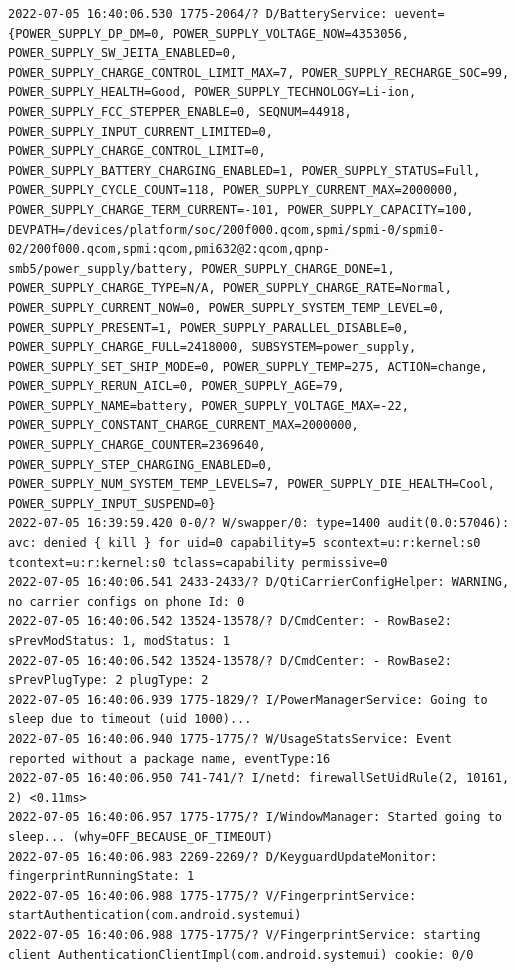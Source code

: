\documentclass[a4paper,12pt]{book}
\begin{document}
\begin{lstlisting}
2022-07-05 16:40:06.530 1775-2064/? D/BatteryService: uevent={POWER_SUPPLY_DP_DM=0, POWER_SUPPLY_VOLTAGE_NOW=4353056, POWER_SUPPLY_SW_JEITA_ENABLED=0, POWER_SUPPLY_CHARGE_CONTROL_LIMIT_MAX=7, POWER_SUPPLY_RECHARGE_SOC=99, POWER_SUPPLY_HEALTH=Good, POWER_SUPPLY_TECHNOLOGY=Li-ion, POWER_SUPPLY_FCC_STEPPER_ENABLE=0, SEQNUM=44918, POWER_SUPPLY_INPUT_CURRENT_LIMITED=0, POWER_SUPPLY_CHARGE_CONTROL_LIMIT=0, POWER_SUPPLY_BATTERY_CHARGING_ENABLED=1, POWER_SUPPLY_STATUS=Full, POWER_SUPPLY_CYCLE_COUNT=118, POWER_SUPPLY_CURRENT_MAX=2000000, POWER_SUPPLY_CHARGE_TERM_CURRENT=-101, POWER_SUPPLY_CAPACITY=100, DEVPATH=/devices/platform/soc/200f000.qcom,spmi/spmi-0/spmi0-02/200f000.qcom,spmi:qcom,pmi632@2:qcom,qpnp-smb5/power_supply/battery, POWER_SUPPLY_CHARGE_DONE=1, POWER_SUPPLY_CHARGE_TYPE=N/A, POWER_SUPPLY_CHARGE_RATE=Normal, POWER_SUPPLY_CURRENT_NOW=0, POWER_SUPPLY_SYSTEM_TEMP_LEVEL=0, POWER_SUPPLY_PRESENT=1, POWER_SUPPLY_PARALLEL_DISABLE=0, POWER_SUPPLY_CHARGE_FULL=2418000, SUBSYSTEM=power_supply, POWER_SUPPLY_SET_SHIP_MODE=0, POWER_SUPPLY_TEMP=275, ACTION=change, POWER_SUPPLY_RERUN_AICL=0, POWER_SUPPLY_AGE=79, POWER_SUPPLY_NAME=battery, POWER_SUPPLY_VOLTAGE_MAX=-22, POWER_SUPPLY_CONSTANT_CHARGE_CURRENT_MAX=2000000, POWER_SUPPLY_CHARGE_COUNTER=2369640, POWER_SUPPLY_STEP_CHARGING_ENABLED=0, POWER_SUPPLY_NUM_SYSTEM_TEMP_LEVELS=7, POWER_SUPPLY_DIE_HEALTH=Cool, POWER_SUPPLY_INPUT_SUSPEND=0}
2022-07-05 16:39:59.420 0-0/? W/swapper/0: type=1400 audit(0.0:57046): avc: denied { kill } for uid=0 capability=5 scontext=u:r:kernel:s0 tcontext=u:r:kernel:s0 tclass=capability permissive=0
2022-07-05 16:40:06.541 2433-2433/? D/QtiCarrierConfigHelper: WARNING, no carrier configs on phone Id: 0
2022-07-05 16:40:06.542 13524-13578/? D/CmdCenter: - RowBase2: sPrevModStatus: 1, modStatus: 1
2022-07-05 16:40:06.542 13524-13578/? D/CmdCenter: - RowBase2: sPrevPlugType: 2 plugType: 2
2022-07-05 16:40:06.939 1775-1829/? I/PowerManagerService: Going to sleep due to timeout (uid 1000)...
2022-07-05 16:40:06.940 1775-1775/? W/UsageStatsService: Event reported without a package name, eventType:16
2022-07-05 16:40:06.950 741-741/? I/netd: firewallSetUidRule(2, 10161, 2) <0.11ms>
2022-07-05 16:40:06.957 1775-1775/? I/WindowManager: Started going to sleep... (why=OFF_BECAUSE_OF_TIMEOUT)
2022-07-05 16:40:06.983 2269-2269/? D/KeyguardUpdateMonitor: fingerprintRunningState: 1
2022-07-05 16:40:06.988 1775-1775/? V/FingerprintService: startAuthentication(com.android.systemui)
2022-07-05 16:40:06.988 1775-1775/? V/FingerprintService: starting client AuthenticationClientImpl(com.android.systemui) cookie: 0/0

\end{lstlisting}
\end{document}
